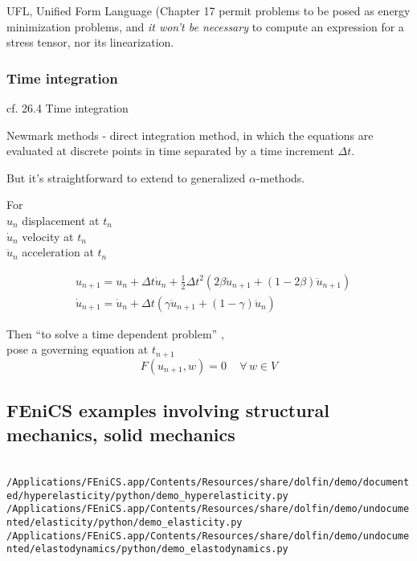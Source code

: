\documentclass[twoside,landscape,10pt]{amsart}
\theoremstyle{plain}
\theoremstyle{definition}
\theoremstyle{remark}
\begin{document}
\begin{multicols*}{2}
UFL, Unified Form Language (Chapter 17 \cite{FEniCS} permit problems to be posed as energy minimization problems, and \emph{it won't be necessary} to compute an expression for a stress tensor, nor its linearization.  

\subsubsection{Time integration}

cf. 26.4 Time integration \cite{FEniCS}

Newmark methods - direct integration method, in which the equations are evaluated at discrete points in time separated by a time increment $\Delta t$.  

But it's straightforward to extend to generalized $\alpha$-methods.

For \\
$u_n$ displacement at $t_n$ \\
$\dot{u}_n$ velocity at $t_n$ \\
$\ddot{u}_n$ acceleration at $t_n$

\[
\begin{aligned}
  & u_{n+1} = u_n + \Delta t \dot{u}_n + \frac{1}{2} \Delta t^2 (2\beta \ddot{u}_{n+1} + (1-2\beta) \ddot{u}_{n+1}) \\ 
  & \dot{u}_{n+1} = \dot{u}_n + \Delta t ( \gamma \ddot{u}_{n+1} + (1- \gamma) \ddot{u}_n)
\end{aligned}
\]

Then ``to solve a time dependent problem'' \cite{FEniCS}, \\
pose a governing equation at $t_{n+1}$ 
\[
F(u_{n+1}, w) = 0 \quad \, \forall \, w \in V
\]


\subsection{FEniCS examples involving structural mechanics, solid mechanics}

\quad \\
\small{
\verb|/Applications/FEniCS.app/Contents/Resources/share/dolfin/demo/documented/hyperelasticity/python/demo_hyperelasticity.py| \\
\verb|/Applications/FEniCS.app/Contents/Resources/share/dolfin/demo/undocumented/elasticity/python/demo_elasticity.py| \\
\verb|/Applications/FEniCS.app/Contents/Resources/share/dolfin/demo/undocumented/elastodynamics/python/demo_elastodynamics.py| 
} \\



\end{multicols*}
\end{document}
